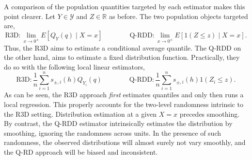 \documentclass[12pt]{article}
\newcommand{\sumn}{\sum_{i=1}^n}
\begin{document}
A comparison of the population quantities targeted by each estimator makes this point clearer. Let $Y \in \mathcal{Y}$ and $Z \in \mathbb{R}$ as before. The two population objects targeted are,
\[
\text{R3D}: \lim_{x \to 0^{\pm}}E[Q_Y(q) \mid X=x] \qquad \qquad \text{Q-RDD}: \lim_{x \to 0^{\pm}} E[\mathrm{1}(Z \leq z) \mid X=x].
\]
Thus, the R3D aims to estimate a conditional average quantile. The Q-RDD on the other hand, aims to estimate a fixed distribution function. Practically, they do so with the following local linear estimators, 
\[
\text{R3D}: \frac1n \sumn s_{\pm,i}(h) Q_{Y_i}(q) \qquad \qquad \text{Q-RDD}: \frac1n \sumn s_{\pm,i}(h) \mathrm{1}(Z_i \leq z). 
\]
As can be seen, the R3D approach \textit{first} estimates quantiles and only then runs a local regression. This properly accounts for the two-level randomness intrinsic to the R3D setting. Distribution estimation at a given $X=x$ precedes smoothing. By contrast, the Q-RDD estimator intrinsically estimates the distribution by smoothing, ignoring the randomness across units. In the presence of such randomness, the observed distributions will almost surely not vary smoothly, and the Q-RD approach will be biased and inconsistent. 
 
\end{document}
